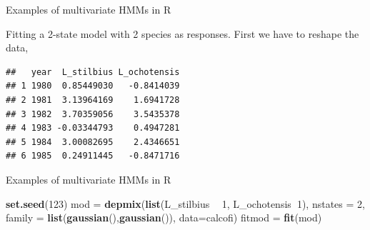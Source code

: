 \documentclass[
  ignorenonframetext,
]{beamer}
\newenvironment{Shaded}{\begin{snugshade}}{\end{snugshade}}
\newcommand{\CommentTok}[1]{\textcolor[rgb]{0.56,0.35,0.01}{\textit{#1}}}
\newcommand{\DataTypeTok}[1]{\textcolor[rgb]{0.13,0.29,0.53}{#1}}
\newcommand{\DecValTok}[1]{\textcolor[rgb]{0.00,0.00,0.81}{#1}}
\newcommand{\KeywordTok}[1]{\textcolor[rgb]{0.13,0.29,0.53}{\textbf{#1}}}
\newcommand{\NormalTok}[1]{#1}
\newcommand{\OperatorTok}[1]{\textcolor[rgb]{0.81,0.36,0.00}{\textbf{#1}}}
\newcommand{\StringTok}[1]{\textcolor[rgb]{0.31,0.60,0.02}{#1}}
\begin{document}
\begin{frame}[fragile]{Examples of multivariate HMMs in R}
\protect\hypertarget{examples-of-multivariate-hmms-in-r-2}{}

Fitting a 2-state model with 2 species as responses. First we have to
reshape the data,

\begin{Shaded}
\end{Shaded}

\begin{verbatim}
##   year  L_stilbius L_ochotensis
## 1 1980  0.85449030   -0.8414039
## 2 1981  3.13964169    1.6941728
## 3 1982  3.70359056    3.5435378
## 4 1983 -0.03344793    0.4947281
## 5 1984  3.00082695    2.4346651
## 6 1985  0.24911445   -0.8471716
\end{verbatim}

\end{frame}

\begin{frame}[fragile]{Examples of multivariate HMMs in R}
\protect\hypertarget{examples-of-multivariate-hmms-in-r-3}{}

\begin{Shaded}
\begin{Highlighting}[]
\KeywordTok{set.seed}\NormalTok{(}\DecValTok{123}\NormalTok{)}
\NormalTok{mod =}\StringTok{ }\KeywordTok{depmix}\NormalTok{(}\KeywordTok{list}\NormalTok{(L_stilbius }\OperatorTok{~}\StringTok{ }\DecValTok{1}\NormalTok{, L_ochotensis}\OperatorTok{~}\DecValTok{1}\NormalTok{), }
             \DataTypeTok{nstates =} \DecValTok{2}\NormalTok{, }
             \DataTypeTok{family =} \KeywordTok{list}\NormalTok{(}\KeywordTok{gaussian}\NormalTok{(),}\KeywordTok{gaussian}\NormalTok{()),}
             \DataTypeTok{data=}\NormalTok{calcofi)}
\NormalTok{fitmod =}\StringTok{ }\KeywordTok{fit}\NormalTok{(mod)}
\end{Highlighting}
\end{Shaded}

\end{frame}
\end{document}

